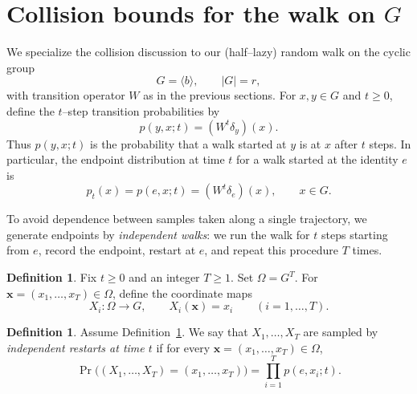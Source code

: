 \documentclass[11pt,reqno]{article}
\numberwithin{equation}{section}
\theoremstyle{plain}
\theoremstyle{definition}
\newtheorem{definition}[theorem]{Definition}
\theoremstyle{remark}
\begin{document}
\section{Collision bounds for the walk on $G$}
\label{N6}

We specialize the collision discussion to our (half--lazy) random walk on the cyclic group
\[
G=\langle b\rangle,\qquad |G|=r,
\]
with transition operator $W$ as in the previous sections. For $x,y\in G$ and $t\ge 0$, define the
$t$--step transition probabilities by
\[
p(y,x;t)=(W^t\delta_y)(x).
\]
Thus $p(y,x;t)$ is the probability that a walk started at $y$ is at $x$ after $t$ steps.  In
particular, the endpoint distribution at time $t$ for a walk started at the identity $e$ is
\[
p_t(x)=p(e,x;t)=(W^t\delta_e)(x),\qquad x\in G.
\]


To avoid dependence between samples taken along a single trajectory, we generate endpoints by
\emph{independent walks}: we run the walk for $t$ steps starting from $e$, record the endpoint,
restart at $e$, and repeat this procedure $T$ times.

\begin{definition}\label{def:omega-coordinates}
Fix $t\ge 0$ and an integer $T\ge 1$. Set $\Omega=G^T$.
For $\mathbf{x}=(x_1,\dots,x_T)\in \Omega$, define the coordinate maps
\[
X_i:\Omega\to G,\qquad X_i(\mathbf{x})=x_i\qquad (i=1,\dots,T).
\]
\end{definition}

\begin{definition}\label{def:iid-walk}
Assume Definition~\ref{def:omega-coordinates}. We say that $X_1,\dots,X_T$ are sampled by
\emph{independent restarts at time $t$} if for every $\mathbf{x}=(x_1,\dots,x_T)\in\Omega$,
\[
\Pr\bigl((X_1,\dots,X_T)=(x_1,\dots,x_T)\bigr)=\prod_{i=1}^T p(e,x_i;t).
\]
\end{definition}

\end{document}
